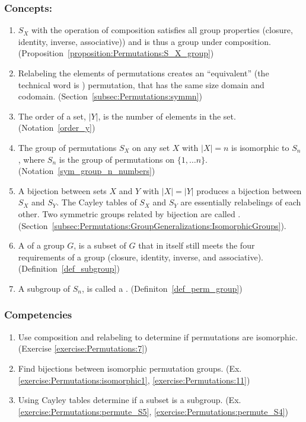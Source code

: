 \subsubsection*{Concepts:}
\begin{enumerate}
\item
$S_X$ with the operation of composition satisfies all group properties  (closure, identity, inverse, associative)) and is thus a group under composition.  (Proposition~\ref{proposition:Permutations:S_X_group})
\item
Relabeling the elements of permutations creates an ``equivalent'' (the technical word is ) permutation, that has the same size domain and codomain. (Section~\ref{subsec:Permutations:symmn})
\item
The order of a set, $|Y|$, is the number of elements in the set. (Notation~\ref{order_y})
\item
The group of permutations  $S_X$ on any set $X$ with $|X|=n$ is isomorphic to $S_n$, where $S_n$ is the group of permutations on $\{1,\ldots n\}$. (Notation~\ref{sym_group_n_numbers})
\item
A  bijection between sets $X$ and $Y$ with $|X|=|Y|$ produces a bijection between $S_X$ and $S_Y$. The Cayley tables of $S_X$ and $S_Y$ are essentially relabelings of each other.   Two symmetric groups related by bijection are called . (Section~\ref{subsec:Permutations:GroupGeneralizations:IsomorphicGroups}).  
\item
A  of a group $G$, is a subset of $G$ that in itself still meets the four requirements of a group (closure, identity, inverse, and associative). (Definition~\ref{def_subgroup})
\item
A subgroup of $S_n$,  is called a . (Definiton~\ref{def_perm_group})
\end{enumerate}

\subsubsection*{Competencies}
\begin{enumerate}
\item
Use composition and relabeling to determine if permutations are isomorphic. (Exercise \ref{exercise:Permutations:7})
\item
Find bijections between isomorphic permutation groups. (Ex. \ref{exercise:Permutations:isomorphic1}, \ref{exercise:Permutations:11})
\item
Using Cayley tables determine if a subset is a subgroup.  (Ex. \ref{exercise:Permutations:permute_S5}, \ref{exercise:Permutations:permute_S4})
\end{enumerate}


